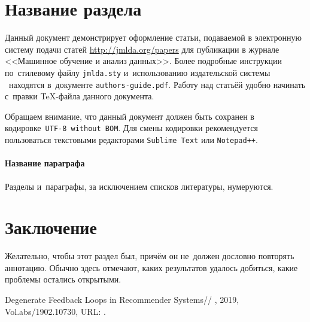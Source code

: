 \documentclass[12pt, twoside]{article}
\begin{document}
\section{Название раздела}
Данный документ демонстрирует оформление статьи,
подаваемой в электронную систему подачи статей \url{http://jmlda.org/papers} для публикации в журнале <<Машинное обучение и анализ данных>>.
Более подробные инструкции по~стилевому файлу \texttt{jmlda.sty} и~использованию издательской системы \LaTeXe\
находятся в~документе \texttt{authors-guide.pdf}.
Работу над статьёй удобно начинать с~правки \TeX-файла данного документа.

Обращаем внимание, что данный документ должен быть сохранен в кодировке~\verb'UTF-8 without BOM'.
Для смены кодировки рекомендуется пользоваться текстовыми редакторами \verb'Sublime Text' или \verb'Notepad++'.

\paragraph{Название параграфа}
Разделы и~параграфы, за исключением списков литературы, нумеруются.

\section{Заключение}
Желательно, чтобы этот раздел был, причём он не~должен дословно повторять аннотацию.
Обычно здесь отмечают, каких результатов удалось добиться, какие проблемы остались открытыми.

\begin{thebibliography}{99}
    Degenerate Feedback Loops in Recommender Systems//
    , 2019, Vol.abs/1902.10730,
	  URL: .

\end{thebibliography}

\end{document}
